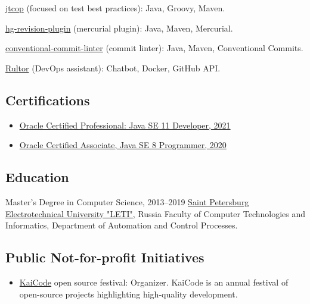 \documentclass{vl}
\begin{document}
    \href{https://github.com/volodya-lombrozo/jtcop}{jtcop} (focused on test best practices):
    Java, Groovy, Maven.

    \href{https://github.com/volodya-lombrozo/hg-revision-plugin}{hg-revision-plugin} (mercurial plugin):
    Java, Maven, Mercurial.

    \href{https://github.com/volodya-lombrozo/conventional-commit-linter}{conventional-commit-linter} (commit linter):
    Java, Maven, Conventional Commits.

    \href{https://www.rultor.com}{Rultor} (DevOps assistant):
    Chatbot, Docker, GitHub API.

    \subsection*{Certifications}

    \begin{itemize}
        \item \href{https://catalog-education.oracle.com/pls/certview/sharebadge?id=87F6A2FE819A5A5AF4120A05900AB28A461EE9A3EE9FBFA02721FADAEB3BCE19}{Oracle Certified Professional: Java SE 11 Developer, 2021}
        \item \href{https://www.credly.com/badges/e2d9ddda-20dc-433d-8ab7-18548fd0fd8f/public_url}{Oracle Certified Associate, Java SE 8 Programmer, 2020}
    \end{itemize}

    \subsection*{Education}

    \begin{samepage}
        Master's Degree in Computer Science, 2013--2019\newline
        \href{https://etu.ru/en/university/}{Saint Petersburg Electrotechnical University "LETI"}, Russia\newline
        Faculty of Computer Technologies and Informatics, Department of Automation and Control Processes.
    \end{samepage}

    \subsection*{Public Not-for-profit Initiatives}
    \begin{itemize}
        \item \href{https://www.kaicode.org}{KaiCode} open source festival: Organizer.
        KaiCode is an annual festival of open-source projects highlighting high-quality development.
    \end{itemize}
\end{document}
